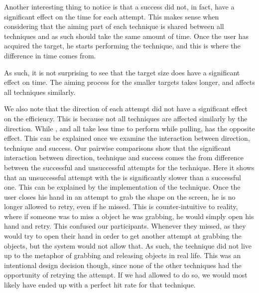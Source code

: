 Another interesting thing to notice is that a success did not, in fact, have a significant effect on the time for each attempt.
This makes sense when considering that the aiming part of each technique is shared between all techniques and as such should take the same amount of time.
Once the user has acquired the target, he starts performing the technique, and this is where the difference in time comes from.

As such, it is not surprising to see that the target size does have a significant effect on time.
The aiming process for the smaller targets takes longer, and affects all techniques similarly.

We also note that the direction of each attempt did not have a significant effect on the efficiency. 
This is because not all techniques are affected similarly by the direction. 
While \swipe, \throw and \tilt all take less time to perform while pulling, \grab has the opposite effect.
This can be explained once we examine the interaction between direction, technique and success.
Our pairwise comparisons show that the significant interaction between direction, technique and success comes the from difference between the successful and unsuccessful attempts for the \grab \pull technique. 
Here it shows that an unsuccessful attempt with the \grab \pull is significantly slower than a successful one. 
This can be explained by the implementation of the technique. 
Once the user closes his hand in an attempt to grab the shape on the screen, he is no longer allowed to retry, even if he missed.
This is counter-intuitive to reality, where if someone was to miss a object he was grabbing, he would simply open his hand and retry.
This confused our participants. 
Whenever they missed, as they would try to open their hand in order to get another attempt at grabbing the objects, but the system would not allow that.
As such, the \grab \pull technique did not live up to the metaphor of grabbing and releasing objects in real life.
This was an intentional design decision though, since none of the other techniques had the opportunity  of retrying the attempt.
If we had allowed \grab \pull to do so, we would most likely have ended up with a perfect hit rate for that technique. 

